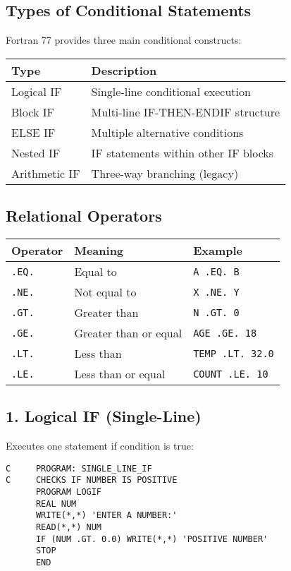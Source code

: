 \documentclass{book}
\begin{document}
\subsection*{Types of Conditional Statements}
Fortran 77 provides three main conditional constructs:
\begin{center}
\begin{tabular}{|l|l|}
\hline
\textbf{Type} & \textbf{Description} \\ 
\hline
Logical IF & Single-line conditional execution \\
Block IF & Multi-line IF-THEN-ENDIF structure \\
ELSE IF & Multiple alternative conditions \\
Nested IF & IF statements within other IF blocks \\
Arithmetic IF & Three-way branching (legacy) \\
\hline
\end{tabular}
\end{center}

\subsection*{Relational Operators}
\begin{center}
\begin{tabular}{|l|l|l|}
\hline
\textbf{Operator} & \textbf{Meaning} & \textbf{Example} \\ 
\hline
\texttt{.EQ.} & Equal to & \texttt{A .EQ. B} \\
\texttt{.NE.} & Not equal to & \texttt{X .NE. Y} \\
\texttt{.GT.} & Greater than & \texttt{N .GT. 0} \\
\texttt{.GE.} & Greater than or equal & \texttt{AGE .GE. 18} \\
\texttt{.LT.} & Less than & \texttt{TEMP .LT. 32.0} \\
\texttt{.LE.} & Less than or equal & \texttt{COUNT .LE. 10} \\
\hline
\end{tabular}
\end{center}

\subsection*{1. Logical IF (Single-Line)}
Executes one statement if condition is true:
\begin{verbatim}
C     PROGRAM: SINGLE_LINE_IF
C     CHECKS IF NUMBER IS POSITIVE
      PROGRAM LOGIF
      REAL NUM
      WRITE(*,*) 'ENTER A NUMBER:'
      READ(*,*) NUM
      IF (NUM .GT. 0.0) WRITE(*,*) 'POSITIVE NUMBER'
      STOP
      END
\end{verbatim}
\end{document}
